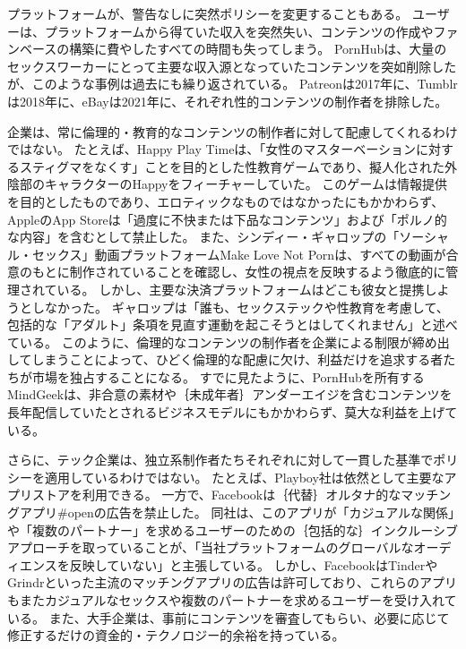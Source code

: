 \documentclass[paper=a4,book,openany]{jlreq}
\begin{document}
プラットフォームが、警告なしに突然ポリシーを変更することもある。
ユーザーは、プラットフォームから得ていた収入を突然失い、コンテンツの作成やファンベースの構築に費やしたすべての時間も失ってしまう。
PornHubは、大量のセックスワーカーにとって主要な収入源となっていたコンテンツを突如削除したが、このような事例は過去にも繰り返されている。
Patreonは2017年に、Tumblrは2018年に、eBayは2021年に、それぞれ性的コンテンツの制作者を排除した\citep{cooper17:_real_conseq_patreon_adult_conten_crack}。

企業は、常に倫理的・教育的なコンテンツの制作者に対して配慮してくれるわけではない。
たとえば、Happy Play Timeは、「女性のマスターベーションに対するスティグマをなくす」ことを目的とした性教育ゲームであり、擬人化された外陰部のキャラクターのHappyをフィーチャーしていた。
このゲームは情報提供を目的としたものであり、エロティックなものではなかったにもかかわらず、AppleのApp Storeは「過度に不快または下品なコンテンツ」および「ポルノ的な内容」を含むとして禁止した\citep{dhapolamay14:_apples_rejec_happy_playt_app}。
また、シンディー・ギャロップの「ソーシャル・セックス」動画プラットフォームMake Love Not Pornは、すべての動画が合意のもとに制作されていることを確認し、女性の視点を反映するよう徹底的に管理されている。
しかし、主要な決済プラットフォームはどこも彼女と提携しようとしなかった。
ギャロップは「誰も、セックステックや性教育を考慮して、包括的な「アダルト」条項を見直す運動を起こそうとはしてくれません」と述べている\citep{deighton20:_why_sex_start_face_uphil_paymen_battl}。
このように、倫理的なコンテンツの制作者を企業による制限が締め出してしまうことによって、ひどく倫理的な配慮に欠け、利益だけを追求する者たちが市場を独占することになる。
すでに見たように、PornHubを所有するMindGeekは、非合意の素材や｛未成年者｝{アンダーエイジ}を含むコンテンツを長年配信していたとされるビジネスモデルにもかかわらず、莫大な利益を上げている。

さらに、テック企業は、独立系制作者たちそれぞれに対して一貫した基準でポリシーを適用しているわけではない。
たとえば、Playboy社は依然として主要なアプリストアを利用できる。
一方で、Facebookは｛代替｝{オルタナ}的なマッチングアプリ\#openの広告を禁止した。
同社は、このアプリが「カジュアルな関係」や「複数のパートナー」を求めるユーザーのための｛包括的な｝{インクルーシブ}アプローチを取っていることが、「当社プラットフォームのグローバルなオーディエンスを反映していない」と主張している\citep{kibbe20:_faceb_has_banned_ads_kink}。
しかし、FacebookはTinderやGrindrといった主流のマッチングアプリの広告は許可しており、これらのアプリもまたカジュアルなセックスや複数のパートナーを求めるユーザーを受け入れている。
また、大手企業は、事前にコンテンツを審査してもらい、必要に応じて修正するだけの資金的・テクノロジー的余裕を持っている。
\end{document}
